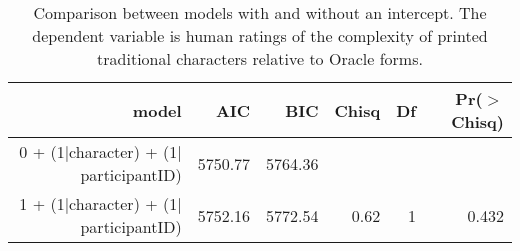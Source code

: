 \begin{table}[ht]
\centering
\begin{tabular}{rrrrrr}
  \hline
model & AIC & BIC & Chisq & Df & Pr($>$Chisq) \\ 
  \hline
0 + (1$|$character) + (1$|$participantID) & 5750.77 & 5764.36 &  &  &  \\ 
  1 + (1$|$character) + (1$|$participantID) & 5752.16 & 5772.54 & 0.62 & 1 & 0.432 \\ 
   \hline
\end{tabular}
\caption{Comparison between models with and without an intercept. The dependent variable is human ratings of the complexity of printed traditional characters relative to Oracle forms.} 
\label{tab:regtable_exp_printed}
\end{table}
